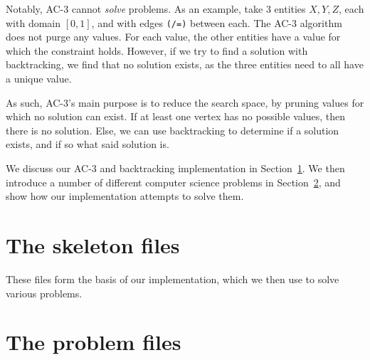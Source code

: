 \documentclass[12pt,a4paper]{article}
\begin{document}

Notably, AC-3 cannot \emph{solve} problems. As an example, take 3 entities $X,Y,Z$, 
each with domain $[0,1]$, and with edges \verb:(/=): between each. 
The AC-3 algorithm does not purge any values. For each value, the other entities have a 
value for which the constraint holds.
However, if we try to find a solution with backtracking, we find that no solution exists, as 
the three entities need to all have a unique value. 

As such, AC-3's main purpose is to reduce the search space, by pruning values for which no
 solution can exist. If at least one vertex has no possible values, then there is no solution.
Else, we can use backtracking to determine if a solution exists, and if so what said solution is.

We discuss our AC-3 and backtracking implementation in Section~\ref{sec:skeleton}. 
We then introduce a number of different computer science problems in Section~\ref{sec:problems}, and show how our implementation
attempts to solve them. 

\section{The skeleton files}\label{sec:skeleton}
These files form the basis of our implementation, which we then use to solve various problems.





\section{The problem files}\label{sec:problems} %













% 





\end{document}
